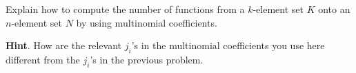 \documentclass{book}
\begin{document}
\setcounter{cpjt}{283}
\addtocounter{cpjt}{-1}
\begin{activity}\label{activity-276}
\hypertarget{p-1434}{}%
Explain how to compute the number of functions from a \(k\)-element set \(K\) onto an \(n\)-element set \(N\) by using multinomial coefficients.%
\par\smallskip%
\noindent\textbf{Hint}.\hypertarget{hint-185}{}\quad%
\hypertarget{p-1435}{}%
How are the relevant \(j_i\)'s in the multinomial coefficients you use here different from the \(j_i\)'s in the previous problem.%
\par\smallskip%
\noindent\end{activity}

\clearpage
\end{document}
